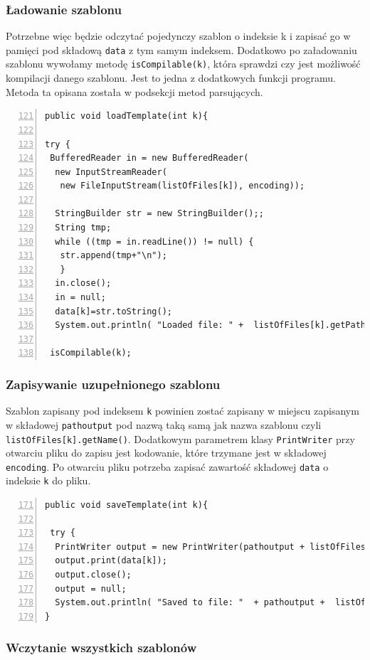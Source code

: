 \subsubsection*{Ładowanie szablonu}
Potrzebne więc będzie odczytać pojedynczy szablon o indeksie k i zapisać go w pamięci pod składową \texttt{data} z tym samym indeksem. 
Dodatkowo po załadowaniu szablonu wywołamy metodę  \texttt{isCompilable(k)}, która sprawdzi czy jest możliwość kompilacji danego szablonu. Jest to jedna z dodatkowych funkcji programu. Metoda ta opisana została w podsekcji metod parsujących. 
 \begin{lstlisting}[numbers=left,firstnumber=121]
public void loadTemplate(int k){
       
try {
 BufferedReader in = new BufferedReader(
  new InputStreamReader(
   new FileInputStream(listOfFiles[k]), encoding));
 
  StringBuilder str = new StringBuilder();;
  String tmp;
  while ((tmp = in.readLine()) != null) {
   str.append(tmp+"\n");
   }
  in.close();
  in = null;
  data[k]=str.toString();
  System.out.println( "Loaded file: " +  listOfFiles[k].getPath());
  
 isCompilable(k);
\end{lstlisting}

\subsubsection*{Zapisywanie uzupełnionego szablonu}

Szablon zapisany pod indeksem \texttt{k} powinien zostać zapisany w miejscu zapisanym w składowej \texttt{pathoutput} pod nazwą taką samą jak nazwa szablonu czyli \texttt{listOfFiles[k].getName()}. Dodatkowym parametrem klasy \texttt{PrintWriter} przy otwarciu pliku do zapisu jest kodowanie, które trzymane jest w składowej \texttt{encoding}. Po otwarciu pliku potrzeba zapisać zawartość składowej \texttt{data} o indeksie \texttt{k} do pliku.

 \begin{lstlisting}[numbers=left,firstnumber=171]
public void saveTemplate(int k){
      
 try {
  PrintWriter output = new PrintWriter(pathoutput + listOfFiles[k].getName(),encoding);
  output.print(data[k]);
  output.close();
  output = null;
  System.out.println( "Saved to file: "  + pathoutput +  listOfFiles[k].getName() );
}
\end{lstlisting}

\subsubsection*{Wczytanie wszystkich szablonów}

